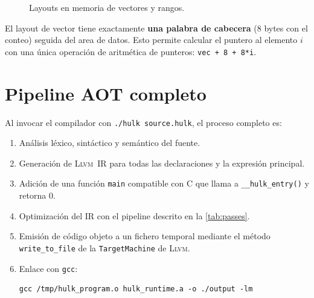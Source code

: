 \documentclass[11pt,a4paper,oneside,openany]{report}
\newcommand{\code}[1]{\texttt{#1}}
\newcommand{\llvm}{\textsc{Llvm}}
\begin{document}
\begin{figure}[H]
\centering
{}
\caption{Layouts en memoria de vectores y rangos.}
\label{fig:layouts-rt}
\end{figure}

El layout de vector tiene exactamente \textbf{una palabra de cabecera}
($8$ bytes con el conteo) seguida del area de datos. Esto permite calcular el
puntero al elemento $i$ con una única operación de aritmética de punteros:
\code{vec + 8 + 8*i}.

\section{Pipeline AOT completo}

Al invocar el compilador con \code{./hulk source.hulk}, el proceso completo es:

\begin{enumerate}
  \item Análisis léxico, sintáctico y semántico del fuente.
  \item Generación de \llvm{}~IR para todas las declaraciones y la expresión
    principal.
  \item Adición de una función \code{main} compatible con C que llama a
    \code{\_\_hulk\_entry()} y retorna 0.
  \item Optimización del IR con el pipeline descrito en la \cref{tab:passes}.
  \item Emisión de código objeto a un fichero temporal mediante el método
    \code{write\_to\_file} de la \code{TargetMachine} de \llvm{}.
  \item Enlace con \code{gcc}:
    \begin{lstlisting}[style=base,numbers=none,xleftmargin=0pt]
gcc /tmp/hulk_program.o hulk_runtime.a -o ./output -lm
    \end{lstlisting}
\end{enumerate}
\end{document}
